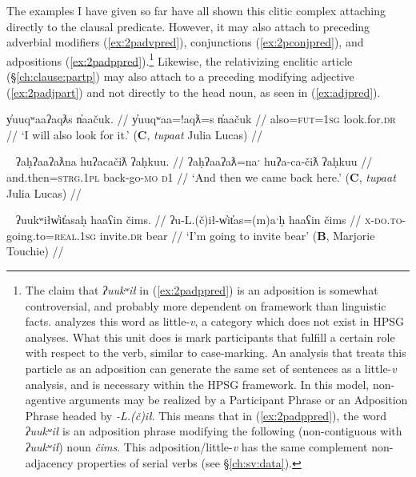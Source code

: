 The examples I have given so far have all shown this clitic complex attaching directly to the clausal predicate. However, it may also attach to preceding adverbial modifiers (\ref{ex:2padvpred}), conjunctions (\ref{ex:2pconjpred}), and adpositions (\ref{ex:2padppred}).\footnote{The claim that \textit{ʔuukʷił} in (\ref{ex:2padppred}) is an adposition is somewhat controversial, and probably more dependent on framework than linguistic facts. \cite{woo2007b} analyzes this word as little-\textit{v}, a category which does not exist in HPSG analyses. What this unit does is mark participants that fulfill a certain role with respect to the verb, similar to case-marking. An analysis that treats this particle as an adposition can generate the same set of sentences as a little-\textit{v} analysis, and is necessary within the HPSG framework. In this model, non-agentive arguments may be realized by a Participant Phrase or an Adposition Phrase headed by \textit{-L.(č)ił}. This means that in (\ref{ex:2padppred}), the word \textit{ʔuukʷił} is an adposition phrase modifying the following (non-contiguous with \textit{ʔuukʷił}) noun \textit{čims}. This adposition/little-\textit{v} has the same complement non-adjacency properties of serial verbs (see \S\ref{ch:sv:data}).} Likewise, the relativizing enclitic article (\S\ref{ch:clause:partp}) may also attach to a preceding modifying adjective (\ref{ex:2padjpart}) and not directly to the head noun, as seen in (\ref{ex:adjpred}).

\ex \label{ex:2padvpred}
\begingl
\glpreamble y̓uuqʷaaʔaqƛs n̓aačuk. //
\gla y̓uuqʷaa=!aqƛ=s n̓aačuk  //
\glb also=\textsc{fut}=\textsc{1sg} look.for.\textsc{dr} //
\glft `I will also look for it.' (\textbf{C}, \textit{tupaat} Julia Lucas) //
\endgl
\xe

\ex~ \label{ex:2pconjpred}
\begingl
\glpreamble ʔaḥʔaaʔaƛna huʔacačiƛ ʔaḥkuu. //
\gla ʔaḥʔaaʔaƛ=naˑ huʔa-ca-čiƛ ʔaḥkuu  //
\glb and.then=\textsc{strg.1pl} back-go-\textsc{mo} \textsc{d1} //
\glft `And then we came back here.' (\textbf{C}, \textit{tupaat} Julia Lucas) //
\endgl
\xe


\ex~ \label{ex:2padppred}
\begingl
\glpreamble ʔuukʷiłw̓it̓asaḥ haaʕin čims. //
\gla ʔu-L.(č)ił-w̓it̓as=(m)aˑḥ haaʕin čims  //
\glb \textsc{x}-\textsc{do.to}-going.to=\textsc{real.1sg} invite.\textsc{dr} bear //
\glft `I'm going to invite bear' (\textbf{B}, Marjorie Touchie) //
\endgl
\xe

